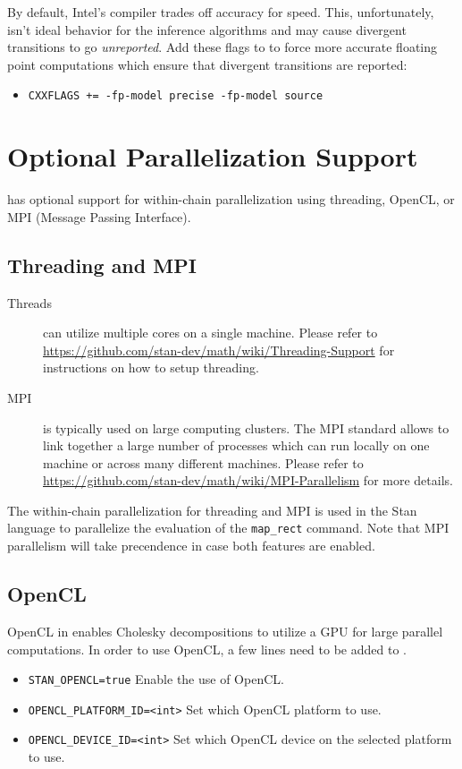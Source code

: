 By default, Intel's compiler trades off accuracy for speed. This,
unfortunately, isn't ideal behavior for the inference algorithms and
may cause divergent transitions to go {\em unreported}. Add these
flags to  to force more accurate floating point
computations which ensure that divergent transitions are reported:
\begin{itemize}
  \item \Verb|CXXFLAGS += -fp-model precise -fp-model source|
\end{itemize}


\section{Optional Parallelization Support}

\CmdStan has optional support for within-chain parallelization using
threading, OpenCL, or MPI (Message Passing Interface).

\subsection{Threading and MPI}
%
\begin{description}
  \item[Threads] can utilize multiple cores on a single
    machine. Please refer to
    \url{https://github.com/stan-dev/math/wiki/Threading-Support} for
    instructions on how to setup threading.
  \item[MPI] is typically used on large computing clusters. The MPI
    standard allows to link together a large number of processes which
    can run locally on one machine or across many
    different machines. Please refer to
    \url{https://github.com/stan-dev/math/wiki/MPI-Parallelism} for
    more details.
\end{description}
%
The within-chain parallelization for threading and MPI is used in the Stan
language to parallelize the evaluation of the \Verb|map_rect| command. Note that
MPI parallelism will take precendence in case both features are
enabled.

\subsection{OpenCL}

OpenCL in \CmdStan enables Cholesky decompositions to utilize a GPU for large parallel computations. In order to use OpenCL, a few lines need to be added to .
\begin{itemize}
  \item \Verb|STAN_OPENCL=true| Enable the use of OpenCL.
  \item \Verb|OPENCL_PLATFORM_ID=<int>| Set which OpenCL platform to use.
  \item \Verb|OPENCL_DEVICE_ID=<int>| Set which OpenCL device on the selected platform to use.
\end{itemize}


